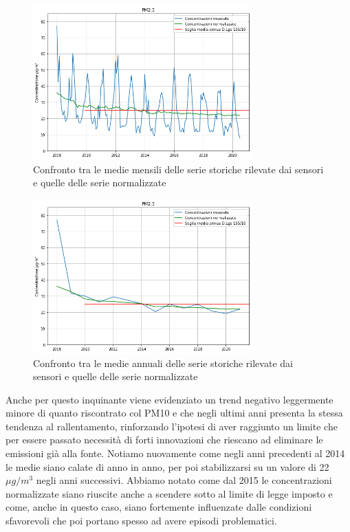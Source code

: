 \documentclass[a4paper,12pt]{report}
\begin{document}
\begin{figure}[h]
\centering
\includegraphics[width=0.75\textwidth]{pm25_medie_mensili}
\caption{Confronto tra le medie mensili delle serie storiche rilevate dai sensori e quelle delle serie normalizzate}
\label{fig:pm25_medie_mensili}
\end{figure}

\begin{figure}[h]
\centering
\includegraphics[width=0.75\textwidth]{pm25_medie_annuali}
\caption{Confronto tra le medie annuali delle serie storiche rilevate dai sensori e quelle delle serie normalizzate}
\label{fig:pm25_medie_annuali}
\end{figure}

Anche per questo inquinante viene evidenziato un trend negativo leggermente minore di quanto riscontrato col PM10 e che negli ultimi anni presenta la stessa tendenza al rallentamento, rinforzando l'ipotesi
 di aver raggiunto un limite che per essere passato necessità di forti innovazioni che riescano ad eliminare le emissioni già alla fonte. Notiamo nuovamente come negli anni precedenti al 2014 le medie siano calate di anno in anno, per poi stabilizzarsi su un valore di 22$\mu g/m^3$ negli anni successivi.
Abbiamo notato come dal 2015 le concentrazioni normalizzate siano riuscite anche a scendere sotto al limite di legge imposto e come, anche in questo caso, siano fortemente influenzate dalle condizioni sfavorevoli che poi portano spesso ad avere episodi problematici.
\end{document}
